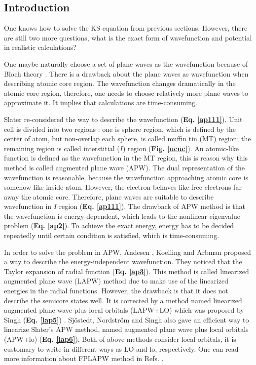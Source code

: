 \documentclass[a4paper, 12pt, titlepage,oneside,drop]{kthesis}
\begin{document}
\subsection{Introduction}

One knows how to solve the KS equation from previous sections. However, there are still two more questions, what is the exact form of 
wavefunction and potential in realistic calculations?  

One maybe naturally choose a set of plane waves as the wavefunction because of Bloch theory \cite{kittel1976introduction}. There is a drawback about the plane waves as wavefunction
when describing atomic core region. The wavefunction changes dramatically in the atomic core region, therefore, one needs to choose relatively more plane
waves to approximate it. It implies that calculations are time-consuming.

Slater re-considered the way to describe the wavefunction (\textbf{Eq. \ref{ap111}}). Unit cell is divided into two regions \cite{slater1937wave,loucks1967augmented}: one is sphere region, which is
defined by the center of atom, but non-overlap each sphere, is called muffin tin (MT) region; the remaining region is called interstitial ($I$)
region (\textbf{Fig. \ref{ucuc}}). An atomic-like function is defined as the wavefunction in the MT region, this is reason why this method is called augmented plane wave (APW).
The dual representation of the wavefunction is reasonable, because the wavefunction approaching atomic core is somehow like inside atom. However, the electron behaves like free electrons far away the atomic core.
Therefore, plane waves are suitable to describe wavefunction in $I$ region (\textbf{Eq. \ref{ap111}}). The drawback of APW method is that the wavefunction is energy-dependent, which leads to the 
nonlinear eigenvalue problem (\textbf{Eq. \ref{ap2}}). To achieve the exact energy, energy has to be decided repeatedly until certain condition is satisfied, which is time-consuming.

In order to solve the problem in APW, Andesen \cite{andersen1975linear}, Koelling and Arbman \cite{koelling1975use} proposed a way to describe the energy-independent wavefunction.
They noticed that the Taylor expansion of radial function (\textbf{Eq. \ref{ap3}}). This method is called linearized augmented plane wave (LAPW) method due to make use of the linearized energies in the radial functions. 
However, the drawback is that it does not describe the semicore states well. It is corrected by a method named linearized augmented plane wave plus local orbitals (LAPW+LO) which was proposed by Singh (\textbf{Eq. \ref{lap5}}) \cite{singh1991ground}.
Sjöstedt, Nordström and Singh  \cite{sjostedt2000alternative} also gave an efficient way to linearize Slater's APW method, named augmented plane wave plus local orbitals (APW+lo) (\textbf{Eq. \ref{lap6}}). Both of above methods consider local orbitals, 
it is customary to write in different ways as LO and lo, respectively. One can read more information about FPLAPW method in Refs. \cite{nordstrom2006planewaves, excitingcode}.
\end{document}
